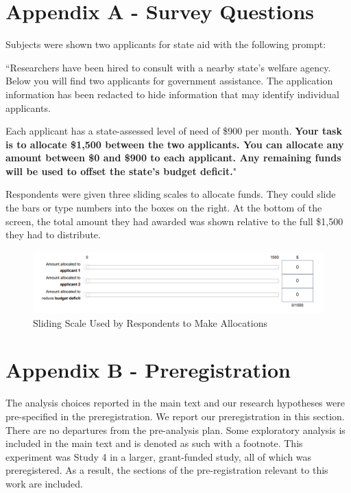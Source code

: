 \documentclass[12pt]{article}%
\begin{document}
	
	\begin{doublespace}


\section*{Appendix A - Survey Questions}
Subjects were shown two applicants for state aid with the following prompt:

``Researchers have been hired to consult with a nearby state’s welfare agency. Below you will find two applicants for government assistance. The application information has been redacted to hide information that may identify individual applicants.

Each applicant has a state-assessed level of need of \$900 per month. \textbf{Your task is to allocate \$1,500 between the two applicants. You can allocate any amount between \$0 and \$900 to each applicant. Any remaining funds will be used to offset the state’s budget deficit.}"

Respondents were given three sliding scales to allocate funds. They could slide the bars or type numbers into the boxes on the right. At the bottom of the screen, the total amount they had awarded was shown relative to the full \$1,500 they had to distribute.

\begin{figure}[h!]
	\centering
	\includegraphics[scale=1]{figs/sliding-scale.png}
	\caption{Sliding Scale Used by Respondents to Make Allocations}
	\label{}
\end{figure}

\clearpage
\section*{Appendix B - Preregistration}

The analysis choices reported in the main text and our research hypotheses were pre-specified in the preregistration. We report our preregistration in this section. There are no departures from the pre-analysis plan. Some exploratory analysis is included in the main text and is denoted as such with a footnote. This experiment was Study 4 in a larger, grant-funded study, all of which was preregistered. As a result, the sections of the pre-registration relevant to this work are included.


\end{doublespace}
\end{document}

